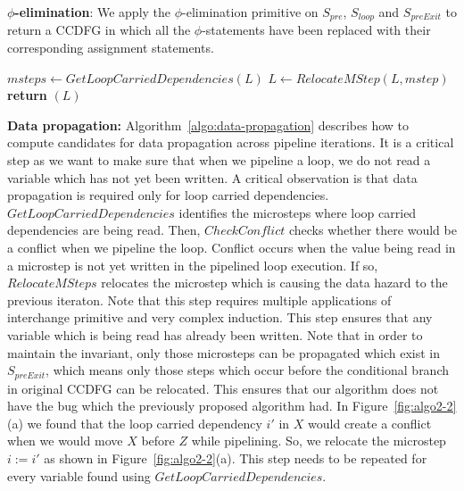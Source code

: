 {\bf $\phi$-elimination}: We apply the $\phi$-elimination primitive on $S_{pre}$, $S_{loop}$ and $S_{preExit}$ to return a CCDFG in which all the $\phi$-statements have been replaced with their corresponding assignment statements. 

\begin{algorithm}
\caption{Data propagation} 
\label{algo:data-propagation}
\begin{algorithmic}[1]
\State $msteps \leftarrow GetLoopCarriedDependencies(L)$
\State $L \leftarrow RelocateMStep (L, mstep)$
\EndIf
\EndFor
\State \textbf{return} $(L)$
\EndProcedure
\end{algorithmic}
\end{algorithm}

{\bf Data propagation:} Algorithm~\ref{algo:data-propagation} describes how to compute candidates for data
propagation across pipeline iterations. It is a critical step as we want to make sure that when we pipeline a loop, we do not read a variable which has not
yet been written. A critical observation is that data propagation is required only for loop carried dependencies.
$GetLoopCarriedDependencies$ identifies the microsteps where loop carried dependencies are being read. Then,
$CheckConflict$ checks whether there would be a conflict when we pipeline the loop. Conflict occurs when the value being read in a microstep is not yet written in the pipelined loop execution. If so, $RelocateMSteps$ relocates the microstep which is causing the data hazard to the previous iteraton. Note that this step requires multiple applications of interchange primitive and very complex induction. This step ensures that any variable which is being read has already been written. Note that in order to maintain the invariant, only those microsteps can be propagated which exist in $S_{preExit}$, which means only those steps which occur before the conditional branch in original CCDFG can be relocated. This ensures that our algorithm does not have the bug which the previously proposed algorithm had. In Figure~\ref{fig:algo2-2}(a) we found that the loop carried dependency $i'$ in $X$ would create a conflict when we would move $X$ before $Z$ while pipelining. So, we relocate the microstep $i := i'$ as shown in Figure~\ref{fig:algo2-2}(a). This step needs to be repeated for every variable found using $GetLoopCarriedDependencies$.

